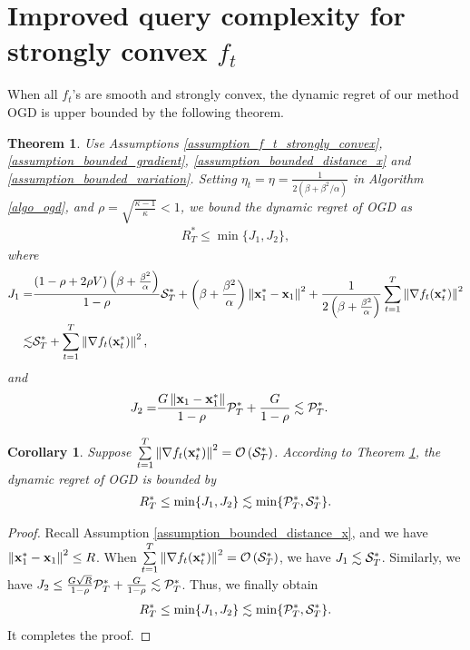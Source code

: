 \documentclass{article}
\newtheorem{Theorem}{\bf{Theorem}}
\newtheorem{Corollary}{\bf{Corollary}}
\begin{document}
\section{Improved query complexity for strongly convex $f_t$} 
\label{sect_dynamic_regret_strongly_convex}


When all $f_t$'s are smooth and strongly convex, the dynamic regret of our method OGD is upper bounded by the following theorem.
\begin{Theorem}
\label{theorem_s_sc_regret}
Use Assumptions \ref{assumption_f_t_strongly_convex}, \ref{assumption_bounded_gradient}, \ref{assumption_bounded_distance_x} and \ref{assumption_bounded_variation}. Setting  $\eta_t = \eta = \frac{1}{2(\beta+\beta^2/\alpha)}$ in Algorithm \ref{algo_ogd}, and $\rho = \sqrt{\frac{\kappa - 1}{\kappa}} < 1$, we bound the dynamic regret of OGD as
\begin{align}
\nonumber     
R_T^{\ast} \le \min \{J_1, J_2\}, 
\end{align} where 
\begin{align}
\nonumber
J_1 = & \frac{(1-\rho + 2\rho V)\left(  \beta + \frac{\beta^2}{\alpha}  \right)}{1-\rho} {\mathcal{S}}_T^{\ast}   + \left(  \beta + \frac{\beta^2}{\alpha}  \right)\left\lVert{\bf x}_1^{\ast} - {\bf x}_1\right\rVert^2   + \frac{1}{ 2\left(  \beta + \frac{\beta^2}{\alpha}  \right) }\sum\limits_{t=1}^{T} \left\lVert\nabla f_t({\bf x}_t^{\ast})\right\rVert^2 \\ \nonumber
\lesssim & {\mathcal{S}}_T^{\ast} + \sum\limits_{t=1}^{T} \left\lVert\nabla f_t({\bf x}_t^{\ast})\right\rVert^2,
\end{align} and 
\begin{align}
\nonumber
J_2 = & \frac{G\left\lVert{\bf x}_1-{\bf x}_1^{\ast}\right\rVert}{1-\rho} {\mathcal{P}}_T^{\ast} + \frac{G}{1-\rho} \lesssim  {\mathcal{P}}_T^{\ast}.
\end{align}

\end{Theorem} 

\begin{Corollary}
Suppose $\sum\limits_{t=1}^{T} \left\lVert\nabla f_t({\bf x}_t^{\ast})\right\rVert^2 = {\mathcal{O}} \left( {\mathcal{S}}_T^{\ast} \right) $. According to Theorem \ref{theorem_s_sc_regret}, the dynamic regret of OGD is bounded by 
\begin{align}
\nonumber
R_T^{\ast} \le \min \{J_1, J_2\} \lesssim \min \{{\mathcal{P}}_T^{\ast}, {\mathcal{S}}_T^{\ast} \}.
\end{align}

\end{Corollary} 
\begin{proof}
Recall Assumption \ref{assumption_bounded_distance_x}, and we have $\left\lVert{\bf x}_1^{\ast} - {\bf x}_1\right\rVert^2  \le R$. When $\sum\limits_{t=1}^{T} \left\lVert\nabla f_t({\bf x}_t^{\ast})\right\rVert^2 = {\mathcal{O}} \left( {\mathcal{S}}_T^{\ast} \right) $, we have $J_1 \lesssim {\mathcal{S}}_T^{\ast}$. Similarly, we have $J_2\le \frac{G\sqrt{R}}{1-\rho} {\mathcal{P}}_T^{\ast} + \frac{G}{1-\rho} \lesssim {\mathcal{P}}_T^{\ast}$. Thus, we finally obtain
\begin{align}
\nonumber
R_T^{\ast} \le \min \{J_1, J_2\} \lesssim \min\{{\mathcal{P}}_T^{\ast}, {\mathcal{S}}_T^{\ast} \}.
\end{align} It completes the proof.

\end{proof}
\end{document}
